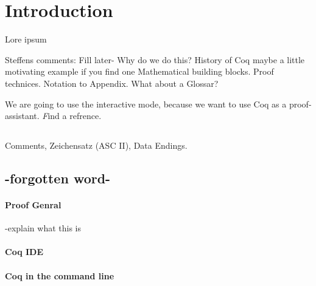 
\section{Introduction}

Lore ipsum \cite{PACGGHSY}

Steffens comments:
Fill later-
 Why do we do this?
 History of Coq
 maybe a little motivating example if you find one
 Mathematical building blocks. Proof technices. Notation to Appendix.
 What about a Glossar?

We are going to use the interactive mode, because we want to use Coq as a proof-assistant. {\emph Find a refrence.}

\subsection{}

Comments, Zeichensatz (ASC II), Data Endings.

\subsection{-forgotten word-}



\paragraph{Proof Genral}
-explain what this is


\paragraph{Coq IDE}

\paragraph{Coq in the command line}




